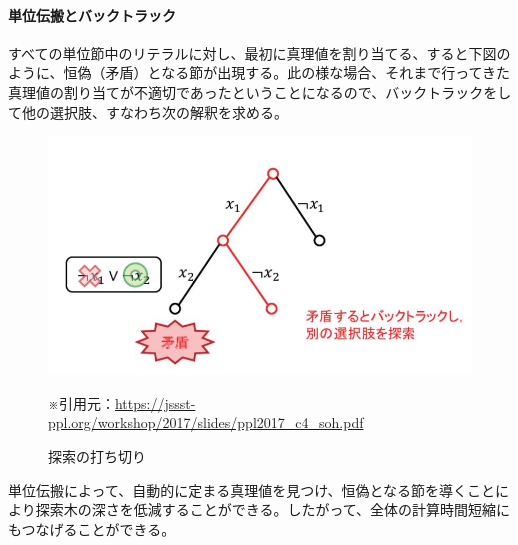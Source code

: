 \documentclass[dvipdfmx]{jsarticle}
\begin{document}
\paragraph{単位伝搬とバックトラック}
すべての単位節中のリテラルに対し、最初に真理値を割り当てる、すると下図のように、恒偽（矛盾）となる節が出現する。此の様な場合、それまで行ってきた真理値の割り当てが不適切であったということになるので、バックトラックをして他の選択肢、すなわち次の解釈を求める。
\begin{figure}[H]
  \centering
  \includegraphics[scale=0.6]{cap3.JPG}
  \caption{探索の打ち切り}
  ※引用元：\url{https://jssst-ppl.org/workshop/2017/slides/ppl2017_c4_soh.pdf}
\end{figure}
単位伝搬によって、自動的に定まる真理値を見つけ、恒偽となる節を導くことにより探索木の深さを低減することができる。したがって、全体の計算時間短縮にもつなげることができる。
\end{document}
